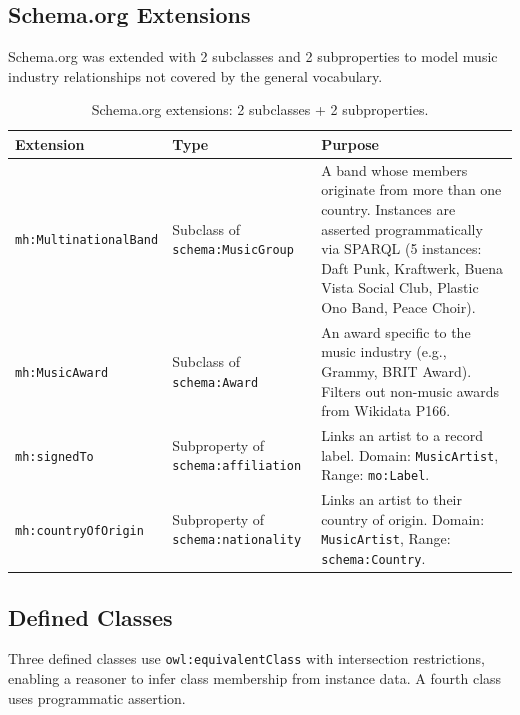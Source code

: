 \documentclass[11pt,a4paper]{article}
\begin{document}
\subsection{Schema.org Extensions}

Schema.org was extended with 2 subclasses and 2 subproperties to model music industry relationships not covered by the general vocabulary.

\begin{table}[h]
\centering
\small
\begin{tabular}{llp{7cm}}
\toprule
\textbf{Extension} & \textbf{Type} & \textbf{Purpose} \\
\midrule
\texttt{mh:MultinationalBand} & Subclass of \texttt{schema:MusicGroup} & A band whose members originate from more than one country. Instances are asserted programmatically via SPARQL (5 instances: Daft Punk, Kraftwerk, Buena Vista Social Club, Plastic Ono Band, Peace Choir). \\[4pt]
\texttt{mh:MusicAward} & Subclass of \texttt{schema:Award} & An award specific to the music industry (e.g., Grammy, BRIT Award). Filters out non-music awards from Wikidata P166. \\[4pt]
\texttt{mh:signedTo} & Subproperty of \texttt{schema:affiliation} & Links an artist to a record label. Domain: \texttt{MusicArtist}, Range: \texttt{mo:Label}. \\[4pt]
\texttt{mh:countryOfOrigin} & Subproperty of \texttt{schema:nationality} & Links an artist to their country of origin. Domain: \texttt{MusicArtist}, Range: \texttt{schema:Country}. \\
\bottomrule
\end{tabular}
\caption{Schema.org extensions: 2 subclasses + 2 subproperties.}
\end{table}

\subsection{Defined Classes}

Three defined classes use \texttt{owl:equivalentClass} with intersection restrictions, enabling a reasoner to infer class membership from instance data. A fourth class uses programmatic assertion.
\end{document}
